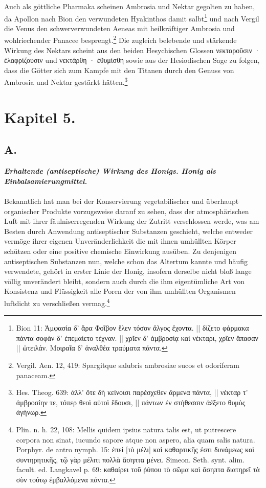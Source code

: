 \documentclass[a4paper, 11pt, oneside]{article}
\begin{document}
Auch als göttliche Pharmaka scheinen Ambrosia und Nektar gegolten zu haben, da Apollon nach Bion den verwundeten Hyakinthos damit salbt\footnote{Bion 11: Ἀμφασία δ' ἄρα Φοῖβον ἕλεν τόσον ἄλγος ἔχοντα. || δίζετο φάρμακα πάντα σοφὰν δ' ἐπεμαίετο τέχναν. || χρῖεν δ' ἀμβροσίᾳ καὶ νέκταρι, χρῖεν ἅπασαν || ὠτειλάν. Μοιραῖα δ' ἀναλθέα τραύματα πάντα.} und nach Vergil die Venus den schwerverwundeten Aeneas mit heilkräftiger Ambrosia und wohlriechender Panacee besprengt.\footnote{Vergil. Aen. 12, 419: Spargitque salubris ambrosiae sucos et odoriferam panaceam.} Die zugleich belebende und stärkende Wirkung des Nektars scheint aus den beiden Hesychischen Glossen νεκταροῦσιν · ἐλαφρίζουσιν und νεκτάρθη · ἐθυμίσθη sowie aus der Hesiodischen Sage zu folgen, dass die Götter sich zum Kampfe mit den Titanen durch den Genuss von Ambrosia und Nektar gestärkt hätten.\footnote{Hes. Theog. 639: ἀλλ' ὅτε δὴ κείνοισι παρέσχεθεν ἄρμενα πάντα, || νέκταρ τ' ἀμβροσίην τε, τόπερ θεοὶ αὐτοὶ ἔδουσι, || πάντων ἐν στήθεσσιν ἀέξετο θυμὸς ἀγήνωρ.}
\clearpage
\section{Kapitel 5.}
\subsection{A.}
\begin{center}
\textbf{\emph{Erhaltende (antiseptische) Wirkung des Honigs. Honig als Einbalsamierungmittel.}}
\end{center}
\paragraph{}
Bekanntlich hat man bei der Konservierung vegetabilischer und überhaupt organischer Produkte vorzugsweise darauf zu sehen, dass der atmosphärischen Luft mit ihrer fäulniserregenden Wirkung der Zutritt verschlossen werde, was am Besten durch Anwendung antiseptischer Substanzen geschieht, welche entweder vermöge ihrer eigenen Unveränderlichkeit die mit ihnen umhüllten Körper schützen oder eine positive chemische Einwirkung ausüben. Zu denjenigen antiseptischen Substanzen nun, welche schon das Altertum kannte und häufig verwendete, gehört in erster Linie der Honig, insofern derselbe nicht bloß lange völlig unverändert bleibt, sondern auch durch die ihm eigentümliche Art von Konsistenz und Flüssigkeit alle Poren der von ihm umhüllten Organismen luftdicht zu verschließen vermag.\footnote{Plin. n. h. 22, 108: Mellis quidem ipsius natura talis est, ut putrescere corpora non sinat, iucundo sapore atque non aspero, alia quam salis natura. Porphyr. de antro nymph. 15: ἐπεὶ [τὸ μέλι] καὶ καθαρτικῆς ἐστι δυνάμεως καὶ συντηρητικῆς, τῷ γὰρ μέλιτι πολλὰ ἄσηπτα μένει. Simeon. Seth. synt. alim. facult. ed. Langkavel p. 69: καθαίρει τοῦ ῥύπου τὸ σῶμα καὶ ἄσηπτα διατηρεῖ τὰ σὺν τούτῳ ἐμβαλλόμενα πάντα.}
\end{document}
